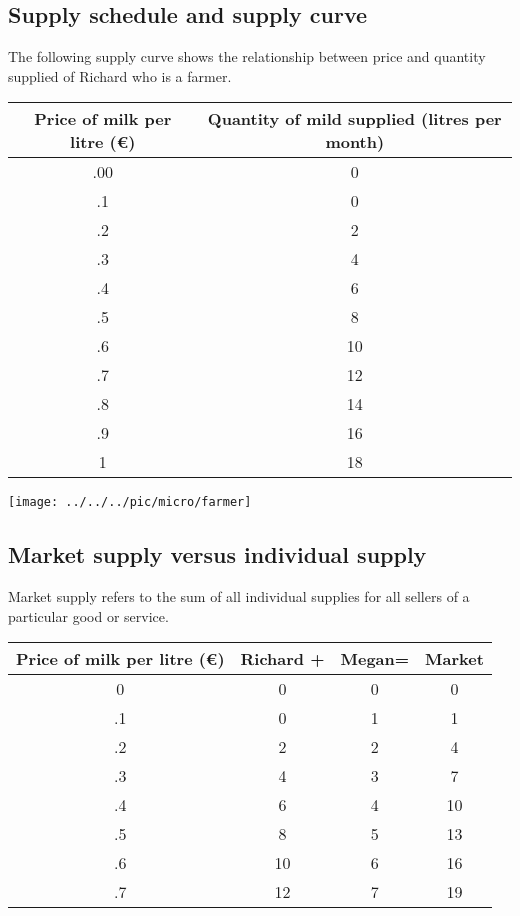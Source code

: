 \pbn
\subsection{Supply schedule and supply curve}
The following supply curve shows the relationship between price and quantity supplied of Richard who is a farmer.

\begin{minipage}{0.5\textwidth}
	\scriptsize
	\begin{center}
		\begin{tabularx}{.9\textwidth}{ CC}
			\toprule
			Price of milk per litre (\euro) & Quantity of mild supplied (litres per month) \\\midrule 
			.00&  0\\ 
			.1&0 \\  
			.2&2  \\  
			.3&  4\\  
			.4&  6\\  
			.5&  8\\  
			.6&  10\\  
			.7&  12\\  
			.8&  14\\
			.9& 16\\
			1&18\\\bottomrule 
		\end{tabularx} 	
	\end{center}
\end{minipage}
\begin{minipage}{0.5\textwidth}
	\begin{center}
		\texttt{[image: ../../../pic/micro/farmer]}
	\end{center}
\end{minipage}

\pbn
\subsection{Market supply versus individual supply}
Market supply refers to the sum of all individual supplies for all sellers of a particular good or service.
\begin{center}
	\begin{tabular}{cccc}\toprule
		Price of milk per litre (\euro) & Richard + & Megan= & Market \\ \midrule
		0 & 0 & 0 & 0 \\ 
		.1 & 0 & 1 & 1 \\ 
		.2 & 2 & 2 & 4 \\ 
		.3 & 4 & 3 & 7 \\ 
		.4 & 6 & 4 & 10 \\ 
		.5 & 8 & 5 & 13 \\ 
		.6 & 10 & 6 & 16 \\ 
		.7 & 12 & 7 & 19 \\\bottomrule	\end{tabular} 
\end{center}\label{tab:supply_milk}


